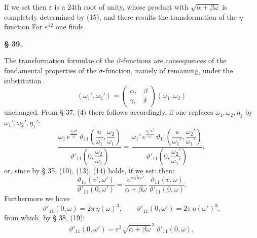 If we set
then $\varepsilon$ is a 24th root of unity, whose product with $\sqrt{\alpha+\beta\omega}$
is completely determined by (15), and there results the transformation
 of the $\eta$-function
For $\varepsilon^{12}$ one finds

\begin{center}
\textbf{§ 39. }
\end{center}

The transformation formulae of the $\vartheta$-functions are consequences
of the fundamental properties of the $\sigma$-function, namely of remaining, under the substitution
\[
(\omega_1', \omega_2') = \begin{pmatrix}\alpha, & \beta \\ \gamma, & \delta\end{pmatrix}(\omega_1, \omega_2)
\]
unchanged. From § 37, (4) there follows accordingly, if
one replaces $\omega_1, \omega_2, \eta_1$ by $\omega_1', \omega_2', \eta_1'$:
\[
\frac{\omega_1\, e^{\frac{\eta_1 u^2}{\omega_1}}\, \vartheta_{11}\!\left(\dfrac{u}{\omega_1}, \dfrac{\omega_2}{\omega_1}\right)}{\vartheta'_{11}\!\left(0, \dfrac{\omega_2}{\omega_1}\right)}
=
\frac{\omega_1'\, e^{\frac{\eta_1' u^2}{\omega_1'}}\, \vartheta_{11}\!\left(\dfrac{u}{\omega_1'}, \dfrac{\omega_2'}{\omega_1'}\right)}{\vartheta'_{11}\!\left(0, \dfrac{\omega_2'}{\omega_1'}\right)},
\]
or, since by § 35, (10), (13), (14)
holds, if we set:
then:
\[
\frac{\vartheta_{11}(v', \omega')}{\vartheta'_{11}(0, \omega')}
= \frac{e^{\pi i\beta v v'}}{\alpha+\beta\omega}\ \frac{\vartheta_{11}(v, \omega)}{\vartheta'_{11}(0, \omega)}.
\]
Furthermore we have
\[
\vartheta'_{11}(0, \omega) = 2\pi\,\eta(\omega)^3, \qquad
\vartheta'_{11}(0, \omega') = 2\pi\,\eta(\omega')^3,
\]
from which, by § 38, (19):
\[
\vartheta'_{11}(0, \omega') = \varepsilon^3\sqrt{\alpha+\beta\omega}^{\,3}\ \vartheta'_{11}(0, \omega),
\]
